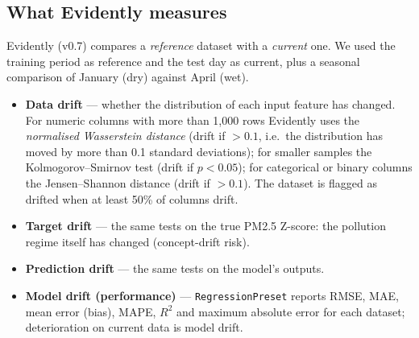 \documentclass[11pt,a4paper]{article}
\begin{document}
\subsection{What Evidently measures}
Evidently (v0.7) compares a \emph{reference} dataset with a \emph{current} one. We used the training period as reference and the test day as current, plus a seasonal comparison of January (dry) against April (wet).
\begin{itemize}
\item \textbf{Data drift} --- whether the distribution of each input feature has changed. For numeric columns with more than 1{,}000 rows Evidently uses the \emph{normalised Wasserstein distance} (drift if $>0.1$, i.e.\ the distribution has moved by more than 0.1 standard deviations); for smaller samples the Kolmogorov--Smirnov test (drift if $p<0.05$); for categorical or binary columns the Jensen--Shannon distance (drift if $>0.1$). The dataset is flagged as drifted when at least 50\% of columns drift.
\item \textbf{Target drift} --- the same tests on the true PM2.5 Z-score: the pollution regime itself has changed (concept-drift risk).
\item \textbf{Prediction drift} --- the same tests on the model's outputs.
\item \textbf{Model drift (performance)} --- \texttt{RegressionPreset} reports RMSE, MAE, mean error (bias), MAPE, $R^2$ and maximum absolute error for each dataset; deterioration on current data is model drift.
\end{itemize}
\end{document}
